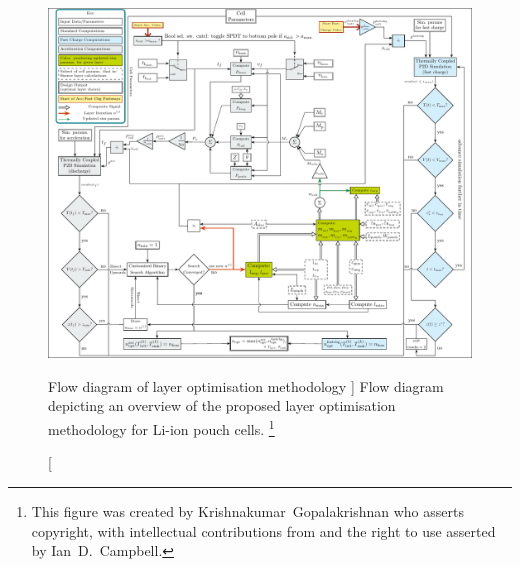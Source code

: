 \begin{figure}[p]
    \begin{minipage}[t]{\textwidth}
        \centering
        \includegraphics[angle=90, width=\textwidth]{chapters/layer_opt/figures/fig_master_flow_diagram}
        \captionsetup{labelsep=note}
        \caption
        [%
        Flow diagram of layer optimisation methodology
        ]%
        {%
            Flow diagram depicting an overview of the proposed layer optimisation methodology
            for Li-ion pouch cells.
        }%
        \label{fig:fig_strategy_schematic}
        \mpfootnotes[1]
        \vspace*{0.7225cm}
        \footnote{This figure was created by \mbox{Krishnakumar Gopalakrishnan} who
            asserts copyright, with intellectual contributions from and the right to
        use asserted by \mbox{Ian D.\ Campbell}.}
    \end{minipage}
\end{figure}

